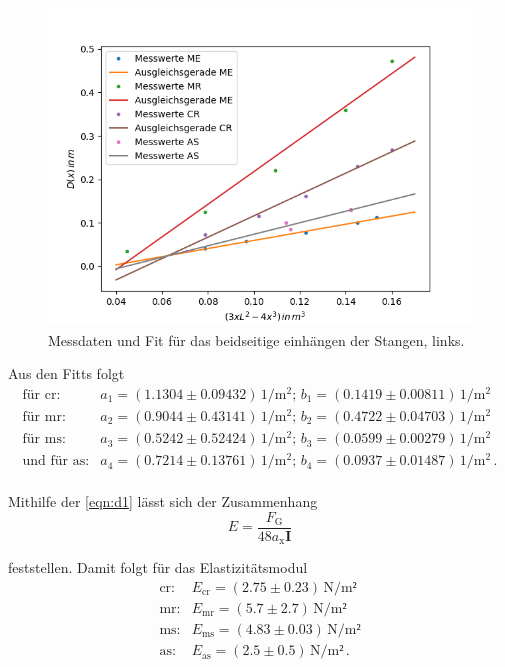 \begin{figure}[H]
	\centering
	\includegraphics{Daten/AS2_l.png}
	\caption{Messdaten und Fit für das beidseitige einhängen der Stangen, links.}
	\label{fig:links}
\end{figure}

\noindent
Aus den Fitts folgt
\begin{align*}
    \text{für cr}:& a_1 = (1.1304 \pm 0.09432) \, \si{1\per\meter^2} ; \, b_1 = (0.1419 \pm 0.00811) \, \si{1\per\meter^2}  \\
    \text{für mr}:& a_2 = (0.9044 \pm 0.43141) \, \si{1\per\meter^2} ; \, b_2 = (0.4722 \pm 0.04703) \, \si{1\per\meter^2} \\
    \text{für ms}:& a_3 = (0.5242 \pm 0.52424) \, \si{1\per\meter^2} ; \, b_3 = (0.0599 \pm 0.00279) \, \si{1\per\meter^2}\\
\text{und für as}:& a_4 = (0.7214 \pm 0.13761) \, \si{1\per\meter^2} ;\,  b_4 = (0.0937 \pm 0.01487) \, \si{1\per\meter^2} \, .\\
\end{align*} 

\noindent
Mithilfe der \autoref{eqn:d1} lässt sich der Zusammenhang 
\begin{equation*}
    E = \frac{F_\text{G}}{48a_\text{x}\symbf{I}}
\end{equation*}

\noindent
feststellen. Damit folgt für das Elastizitätsmodul%
\begin{align*}
    \text{cr}:& E_\text{cr} = (2.75 \pm 0.23)    \, \si{\newton\per\meter²}\\
    \text{mr}:& E_\text{mr} = (5.7 \pm 2.7) \, \si{\newton\per\meter²}\\
    \text{ms}:& E_\text{ms} = (4.83 \pm 0.03) \, \si{\newton\per\meter²} \\
    \text{as}:& E_\text{as} = (2.5\pm 0.5)  \, \si{\newton\per\meter²} \, .\\
\end{align*} 

